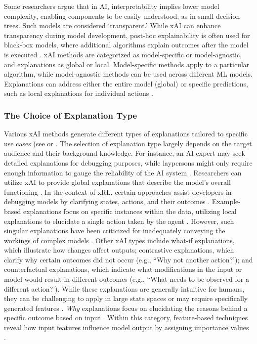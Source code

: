 Some researchers argue that in AI, interpretability implies lower model complexity, enabling components to be easily understood, as in small decision trees. Such models are considered ‘transparent.’ While xAI can enhance transparency during model development, post-hoc explainability is often used for black-box models, where additional algorithms explain outcomes after the model is executed .
xAI methods are categorized as model-specific or model-agnostic, and explanations as global or local. Model-specific methods apply to a particular algorithm, while model-agnostic methods can be used across different ML models. Explanations can address either the entire model (global) or specific predictions, such as local explanations for individual actions .

\subsubsection{The Choice of Explanation Type}
Various xAI methods generate different types of explanations tailored to specific use cases (see  or . The selection of explanation type largely depends on the target audience and their background knowledge. For instance, an AI expert may seek detailed explanations for debugging purposes, while laypersons might only require enough information to gauge the reliability of the AI system . Researchers can utilize xAI to provide global explanations that describe the model's overall functioning . In the context of xRL, certain approaches assist developers in debugging models by clarifying states, actions, and their outcomes . Example-based explanations focus on specific instances within the data, utilizing local explanations to elucidate a single action taken by the agent . However, such singular explanations have been criticized for inadequately conveying the workings of complex models .
Other xAI types include what-if explanations, which illustrate how changes affect outputs; contrastive explanations, which clarify why certain outcomes did not occur (e.g., ``Why not another action?'); and counterfactual explanations, which indicate what modifications in the input or model would result in different outcomes (e.g., ``What needs to be observed for a different action?'). While these explanations are generally intuitive for humans, they can be challenging to apply in large state spaces or may require specifically generated features .
\textit{Why} explanations focus on elucidating the reasons behind a specific outcome based on input . Within this category, feature-based techniques reveal how input features influence model output by assigning importance values .

